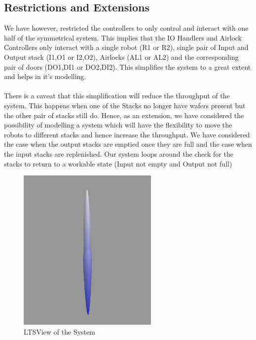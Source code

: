 \documentclass[a4paper,12pt]{article}
\begin{document}
\subsection{Restrictions and Extensions}
We have however, restricted the controllers to only control and interact with one half of the symmetrical system. This implies that the IO Handlers and Airlock Controllers only interact with a single robot (R1 or R2), single pair of Input and Output stack (I1,O1 or I2,O2), Airlocks (AL1 or AL2) and the corresponding pair of doors (DO1,DI1 or DO2,DI2). This simplifies the system to a great extent and helps in it's modelling.
\\
\\There is a caveat that this simplification will reduce the throughput of the system. This happens when one of the Stacks no longer have wafers present but the other pair of stacks still do. Hence, as an extension, we have considered the possibility of modelling a system which will have the flexibility to move the robots to different stacks and hence increase the throughput. 
We have considered the case when the output stacks are emptied once they are full and the case when the input stacks are replenished. Our system loops around the check for the stacks to return to a workable state (Input not empty and Output not full)
\begin{figure}[ht]
\centering
    \includegraphics[width=\textwidth, height=8cm]{3D-Model.png}
  \caption{LTSView of the System}
  \label{fig:ltsview}
\end{figure}
\newpage
\end{document}
